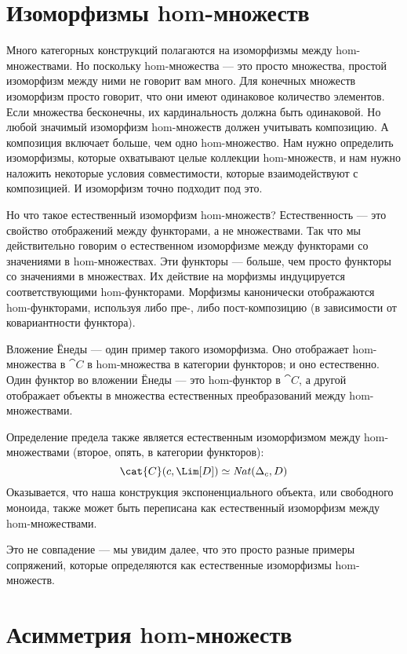 \section{Изоморфизмы hom-множеств}

Много категорных конструкций полагаются на изоморфизмы между
hom-множествами. Но поскольку hom-множества --- это просто множества, простой изоморфизм между
ними не говорит вам много. Для конечных множеств изоморфизм просто говорит,
что они имеют одинаковое количество элементов. Если множества бесконечны,
их кардинальность должна быть одинаковой. Но любой значимый изоморфизм
hom-множеств должен учитывать композицию. А композиция включает
больше, чем одно hom-множество. Нам нужно определить изоморфизмы, которые охватывают целые
коллекции hom-множеств, и нам нужно наложить некоторые условия совместимости,
которые взаимодействуют с композицией. И 
изоморфизм точно подходит под это.

Но что такое естественный изоморфизм hom-множеств? Естественность --- это свойство
отображений между функторами, а не множествами. Так что мы действительно говорим о
естественном изоморфизме между функторами со значениями в hom-множествах. Эти функторы ---
больше, чем просто функторы со значениями в множествах. Их действие на морфизмы индуцируется
соответствующими hom-функторами. Морфизмы канонически отображаются
hom-функторами, используя либо пре-, либо пост-композицию (в зависимости от
ковариантности функтора).

Вложение Ёнеды --- один пример такого изоморфизма. Оно отображает
hom-множества в $\cat{C}$ в hom-множества в категории функторов; и оно
естественно. Один функтор во вложении Ёнеды --- это hom-функтор в
$\cat{C}$, а другой отображает объекты в множества естественных преобразований
между hom-множествами.

Определение предела также является естественным изоморфизмом между hom-множествами
(второе, опять, в категории функторов):
\[\cat{C}(c, \Lim[D]) \simeq \mathit{Nat}(\Delta_c, D)\]
Оказывается, что наша конструкция экспоненциального объекта, или
свободного моноида, также может быть переписана как естественный изоморфизм между
hom-множествами.

Это не совпадение --- мы увидим далее, что это просто разные
примеры сопряжений, которые определяются как естественные изоморфизмы
hom-множеств.

\section{Асимметрия hom-множеств}

